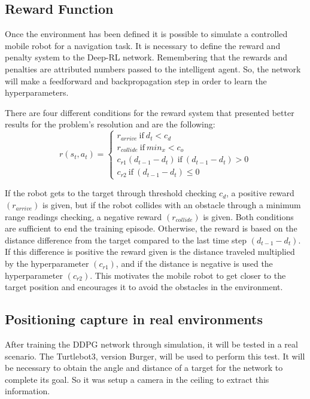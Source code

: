\subsection*{Reward Function}

Once the environment has been defined it is possible to simulate a controlled mobile robot for a navigation task.
It is necessary to define the reward and penalty system to the Deep-RL network.
Remembering that the rewards and penalties are attributed numbers passed to the intelligent agent.
So, the network will make a feedforward and backpropagation step in order to learn the hyperparameters.

There are four different conditions for the reward system that presented better results for the problem's resolution and are the following:
\begin{equation}
r (s_t, a_t) = 
\begin{cases}
r_{arrive} \ \textrm{if} \ d_t < c_d
\\
r_{collide} \ \textrm{if}\ min_x < c_o
\\
c_{r1}(d_{t-1} - d_t) \ \textrm{if} \ (d_{t-1} - d_t) > 0
\\
c_{r2} \ \textrm{if} \ (d_{t-1} - d_t) \leq 0
\end{cases}
\end{equation}

If the robot gets to the target through threshold checking $c_d$, a positive reward $(r_{arrive})$ is given, but if the robot collides with an obstacle through a minimum range readings checking, a negative reward $(r_{collide})$ is given.
Both conditions are sufficient to end the training episode.
Otherwise, the reward is based on the distance difference from the target compared to the last time step $(d_{t-1} - d_t)$. 
If this difference is positive the reward given is the distance traveled multiplied by the hyperparameter $(c_{r1})$, and if the distance is negative is used the hyperparameter $(c_{r2})$.
This motivates the mobile robot to get closer to the target position and encourages it to avoid the obstacles in the environment.

\subsection*{Positioning capture in real environments}

After training the DDPG network through simulation, it will be tested in a real scenario.
The Turtlebot3, version Burger, will be used to perform this test.
It will be necessary to obtain the angle and distance of a target for the network to complete its goal.
So it was setup a camera in the ceiling to extract this information.

